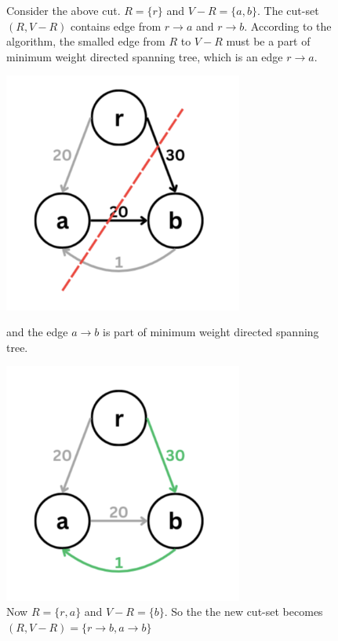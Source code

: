 \documentclass{article}
\begin{document}
\begin{enumerate}
\begin{enumerate}
\begin{figure}[H]
\begin{minipage}{0.4\textwidth}
          \caption{Consider the above cut. $R=\{r\}$ and $V-R=\{a,b\}$. The cut-set $(R,V-R)$ contains edge from $r\rightarrow a$ and $r\rightarrow b$. According to the algorithm, the smalled edge from $R$ to $V-R$ must be a part of minimum weight directed spanning tree, which is an edge $r\rightarrow a$.}
        \end{minipage}
      \end{figure}

      \begin{figure}[H]
        \centering
        \begin{minipage}{0.4\textwidth}
          \centering
          \includegraphics[width=0.7\textwidth]{image3.png}
          \caption{Now $R=\{r,a\}$ and $V-R=\{b\}$. So the the new cut-set becomes $(R,V-R)=\{r\rightarrow b,a\rightarrow b\}$} and the edge $a\rightarrow b$ is part of minimum weight directed spanning tree.
        \end{minipage}
        \hspace{1cm}
        \begin{minipage}{0.4\textwidth}
          \centering
          \includegraphics[width=0.7\textwidth]{image4.png}

\end{minipage}
\end{figure}
\end{enumerate}
\end{enumerate}
\end{document}
